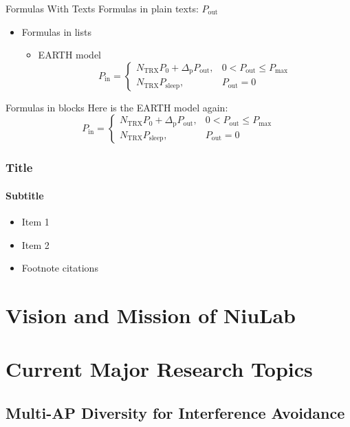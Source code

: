 \documentclass[usepdftitle=false,onlycurpagenum,secheader]{beamer}
\begin{document}
\begin{frame}{Formulas With Texts}
  Formulas in plain texts: {\rmfamily $P_\text{out}$}
  \begin{itemize}
    \item Formulas in lists
      \begin{itemize}
        \item EARTH model
\begin{equation}
  P_\text{in} = \begin{cases}
    N_{\text{TRX}} P_0 + \Delta_\text{p} P_\text{out}, & 0 < P_\text{out} \le P_\text{max} \\
    N_{\text{TRX}} P_\text{sleep}, & P_\text{out} = 0
  \end{cases}
\end{equation}
      \end{itemize}
  \end{itemize}
  \begin{exampleblock}{Formulas in blocks}
    Here is the EARTH model again:\rmfamily
\begin{equation}
  P_\text{in} = \begin{cases}
    N_{\text{TRX}} P_0 + \Delta_\text{p} P_\text{out}, & 0 < P_\text{out} \le P_\text{max} \\
    N_{\text{TRX}} P_\text{sleep}, & P_\text{out} = 0
  \end{cases}
\end{equation}
  \end{exampleblock}
\end{frame}

\begin{frame}
  \frametitle{Title}
  \framesubtitle{Subtitle}
  \begin{itemize}
    \item Item 1
    \item Item 2
    \item Footnote citations~
  \end{itemize}
\end{frame}

\section{Vision and Mission of \protect\alert{NiuLab}}
\section{Current Major Research Topics}
\subsection{Multi-AP Diversity for Interference Avoidance}
\end{document}
